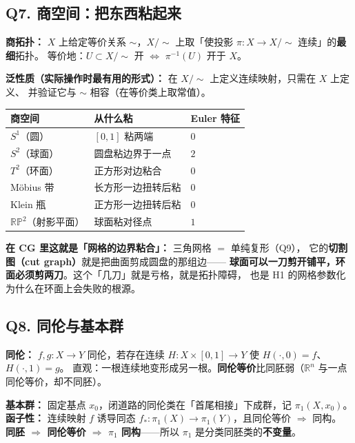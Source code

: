 \subsection{Q7. 商空间：把东西粘起来}

\textbf{商拓扑：} $X$ 上给定等价关系 $\sim$，$X/{\sim}$ 上取「使投影 $\pi:X\to X/{\sim}$ 连续」的\textbf{最细}拓扑。
等价地：$U\subset X/{\sim}$ 开 $\iff$ $\pi^{-1}(U)$ 开于 $X$。

\textbf{泛性质（实际操作时最有用的形式）：} 在 $X/{\sim}$ 上定义连续映射，只需在 $X$ 上定义、
并验证它与 $\sim$ 相容（在等价类上取常值）。

\begin{center}
\begin{tabular}{lll}
\toprule
\textbf{商空间} & \textbf{从什么粘} & \textbf{Euler 特征} \\
\midrule
$S^1$（圆） & $[0,1]$ 粘两端 & $0$ \\
$S^2$（球面） & 圆盘粘边界于一点 & $2$ \\
$T^2$（环面） & 正方形对边粘合 & $0$ \\
Möbius 带 & 长方形一边扭转后粘 & $0$ \\
Klein 瓶 & 正方形一边扭转后粘 & $0$ \\
$\mathbb{RP}^2$（射影平面） & 球面粘对径点 & $1$ \\
\bottomrule
\end{tabular}
\end{center}

\textbf{在 CG 里这就是「网格的边界粘合」：} 三角网格 $=$ 单纯复形（Q9），
它的\textbf{切割图（cut graph）}就是把曲面剪成圆盘的那组边——
\textbf{球面可以一刀剪开铺平，环面必须剪两刀}。这个「几刀」就是亏格，就是拓扑障碍，
也是 H1 的网格参数化为什么在环面上会失败的根源。

\subsection{Q8. 同伦与基本群}

\textbf{同伦：} $f,g:X\to Y$ 同伦，若存在连续 $H:X\times[0,1]\to Y$ 使 $H(\cdot,0)=f$、$H(\cdot,1)=g$。
直观：一根连续地变形成另一根。\textbf{同伦等价}比同胚弱（$\mathbb R^n$ 与一点同伦等价，却不同胚）。

\textbf{基本群：} 固定基点 $x_0$，闭道路的同伦类在「首尾相接」下成群，记 $\pi_1(X,x_0)$。
\textbf{函子性：} 连续映射 $f$ 诱导同态 $f_*:\pi_1(X)\to\pi_1(Y)$，且同伦等价 $\Longrightarrow$ 同构。
\textbf{同胚 $\Rightarrow$ 同伦等价 $\Rightarrow$ $\pi_1$ 同构}——所以 $\pi_1$ 是分类同胚类的\textbf{不变量}。

